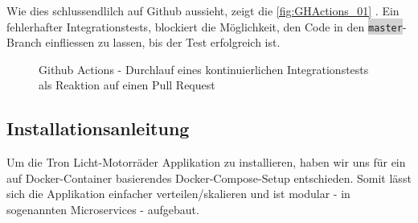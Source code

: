 \documentclass[11pt,ngerman]{article}
\newcommand{\inlinecode}[2]{\colorbox{lightgray}{\lstinline[language=#1]$#2$}}
\begin{document}
    Wie dies schlussendlilch auf Github aussieht, zeigt die \autoref{fig:GHActions_01} . Ein fehlerhafter Integrationstests, blockiert die Möglichkeit, den Code in den \inlinecode{bash}{master}-Branch einfliessen zu lassen, bis der Test erfolgreich ist.
    \begin{figure}[H]
        \centering
        \caption{Github Actions - Durchlauf eines kontinuierlichen Integrationstests als Reaktion auf einen \Gls{Pull Request} }
        \label{fig:GHActions_01}
    \end{figure}

    \subsection{Installationsanleitung}
    Um  die Tron Licht-Motorräder Applikation zu installieren, haben  wir uns für ein auf \Gls{Docker}-Container basierendes \Gls{Docker-Compose}-Setup entschieden. Somit lässt sich die Applikation einfacher verteilen/skalieren und ist modular - in sogenannten \Glspl{Microservice} - aufgebaut.
\end{document}

